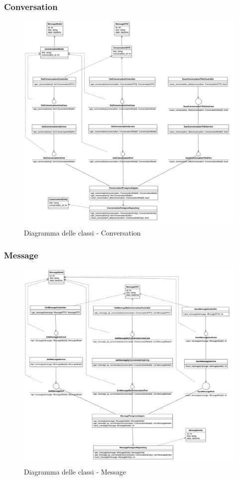 \subsubsection{Conversation}
\begin{figure}[H]
    \centering
    \includegraphics[width=\linewidth, height=0.8\textheight, keepaspectratio]{./img/Conversation.png}
    \caption{Diagramma delle classi - Conversation}
    \label{fig:conversation}
\end{figure}


\subsubsection{Message}
\begin{figure}[H]
    \centering
    \includegraphics[width=\linewidth, height=0.8\textheight, keepaspectratio]{./img/Message.png}
    \caption{Diagramma delle classi - Message}
    \label{fig:message}
\end{figure}

